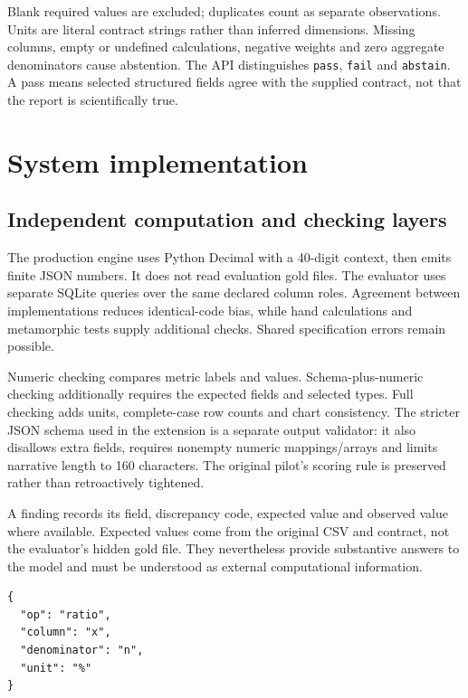 Blank required values are excluded; duplicates count as separate observations. Units are literal contract strings rather than inferred dimensions. Missing columns, empty or undefined calculations, negative weights and zero aggregate denominators cause abstention. The API distinguishes \texttt{pass}, \texttt{fail} and \texttt{abstain}. A pass means selected structured fields agree with the supplied contract, not that the report is scientifically true.

\section{System implementation}
\subsection{Independent computation and checking layers}
The production engine uses Python Decimal with a 40-digit context, then emits finite JSON numbers. It does not read evaluation gold files. The evaluator uses separate SQLite queries over the same declared column roles. Agreement between implementations reduces identical-code bias, while hand calculations and metamorphic tests supply additional checks. Shared specification errors remain possible.

Numeric checking compares metric labels and values. Schema-plus-numeric checking additionally requires the expected fields and selected types. Full checking adds units, complete-case row counts and chart consistency. The stricter JSON schema used in the extension is a separate output validator: it also disallows extra fields, requires nonempty numeric mappings/arrays and limits narrative length to 160 characters. The original pilot's scoring rule is preserved rather than retroactively tightened.

A finding records its field, discrepancy code, expected value and observed value where available. Expected values come from the original CSV and contract, not the evaluator's hidden gold file. They nevertheless provide substantive answers to the model and must be understood as external computational information.

\begin{lstlisting}[style=vscode,caption={An approved ratio contract. The checker does not infer the intended research question.},label={lst:contract}]
{
  "op": "ratio",
  "column": "x",
  "denominator": "n",
  "unit": "%"
}
\end{lstlisting}


